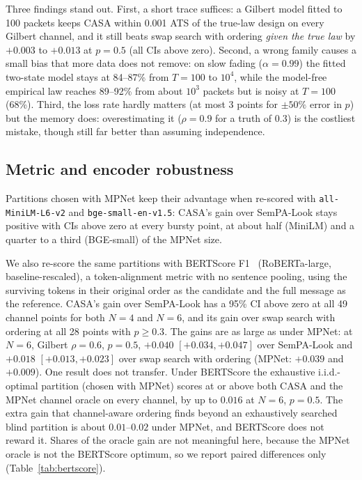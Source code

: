 \documentclass[journal,onecolumn,11pt,draftclsnofoot]{IEEEtran}
\begin{document}
Three findings stand out. First, a short trace suffices: a Gilbert model fitted to 100 packets keeps CASA within 0.001 ATS of the true-law design on every Gilbert channel, and it still beats swap search with ordering \emph{given the true law} by $+0.003$ to $+0.013$ at $p=0.5$ (all CIs above zero). Second, a wrong family causes a small bias that more data does not remove: on slow fading ($\alpha=0.99$) the fitted two-state model stays at 84--87\% from $T=100$ to $10^4$, while the model-free empirical law reaches 89--92\% from about $10^3$ packets but is noisy at $T=100$ (68\%). Third, the loss rate hardly matters (at most 3 points for $\pm50\%$ error in $p$) but the memory does: overestimating it ($\rho=0.9$ for a truth of $0.3$) is the costliest mistake, though still far better than assuming independence.

\subsection{Metric and encoder robustness}
Partitions chosen with MPNet keep their advantage when re-scored with \texttt{all-MiniLM-L6-v2} and \texttt{bge-small-en-v1.5}: CASA's gain over SemPA-Look stays positive with CIs above zero at every bursty point, at about half (MiniLM) and a quarter to a third (BGE-small) of the MPNet size. 

We also re-score the same partitions with BERTScore F1~\cite{zhang2020bertscore} (RoBERTa-large, baseline-rescaled), a token-alignment metric with no sentence pooling, using the surviving tokens in their original order as the candidate and the full message as the reference. CASA's gain over SemPA-Look has a 95\% CI above zero at all 49 channel points for both $N=4$ and $N=6$, and its gain over swap search with ordering at all 28 points with $p\ge0.3$. The gains are as large as under MPNet: at $N=6$, Gilbert $\rho=0.6$, $p=0.5$, $+0.040$ $[+0.034,+0.047]$ over SemPA-Look and $+0.018$ $[+0.013,+0.023]$ over swap search with ordering (MPNet: $+0.039$ and $+0.009$). One result does not transfer. Under BERTScore the exhaustive i.i.d.-optimal partition (chosen with MPNet) scores at or above both CASA and the MPNet channel oracle on every channel, by up to $0.016$ at $N=6$, $p=0.5$. The extra gain that channel-aware ordering finds beyond an exhaustively searched blind partition is about $0.01$--$0.02$ under MPNet, and BERTScore does not reward it. Shares of the oracle gain are not meaningful here, because the MPNet oracle is not the BERTScore optimum, so we report paired differences only (Table~\ref{tab:bertscore}).
\end{document}
